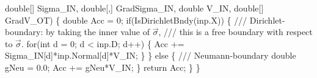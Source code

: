 {\btab \btab double[] Sigma\_IN, double[,] GradSigma\_IN, double V\_IN, double[] GradV\_OT) \{ \newline 
 \newline 
\btab \btab double Acc = 0; \newline 
 \newline 
\btab \btab if(IsDirichletBndy(inp.X)) \{ \newline 
            /// Dirichlet-boundary: by taking the inner value of $\vec{\sigma}$, 
            /// this is a free boundary with respect to $\vec{\sigma}$.
\btab \btab \btab for(int d = 0; d < inp.D; d++) \{ \newline 
\btab \btab \btab \btab Acc += Sigma\_IN[d]*inp.Normal[d]*V\_IN; \newline 
\btab \btab \btab \} \newline 
\btab \btab \} else \{ \newline 
            /// Neumann-boundary
\btab \btab \btab double gNeu = 0.0; \newline 
\btab \btab \btab Acc += gNeu*V\_IN; \newline 
\btab \btab \} \newline 
\btab \btab return Acc; \newline 
\btab \} \newline 
\}
 }
\BoSSSexe
